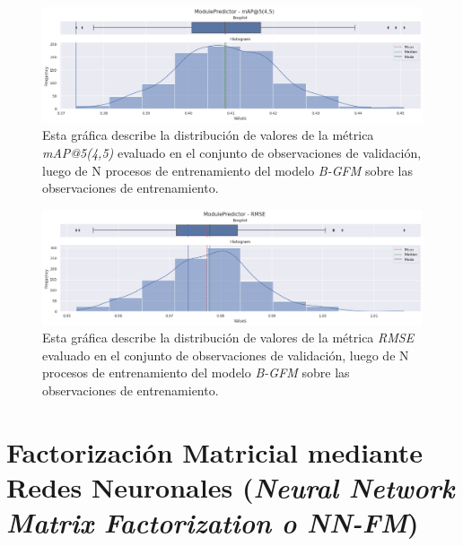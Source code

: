 \documentclass[11pt,a4paper,twoside]{thesis}
\begin{document}
\begin{figure}[h!]
	\centering
	\includegraphics[width=15cm]{./images/metrics-BGFM-mapk.png}
	\caption{Esta gráfica describe la distribución de valores de la métrica
		\textit{mAP@5(4,5)} evaluado en el conjunto de observaciones de
		validación, luego de N procesos de entrenamiento del modelo
		\textit{B-GFM} sobre las observaciones de entrenamiento.}
\end{figure}

\clearpage

\begin{figure}[h!]
	\centering
	\includegraphics[width=15cm]{./images/metrics-BGFM-RMSE.png}
	\caption{Esta gráfica describe la distribución de valores de la
		métrica \textit{RMSE} evaluado en el conjunto de observaciones
		de validación, luego de N procesos de entrenamiento del
		modelo \textit{B-GFM} sobre las observaciones de entrenamiento.}
\end{figure}

\section{Factorización Matricial mediante Redes Neuronales
  (\textit{Neural Network Matrix Factorization o NN-FM})}
\end{document}
